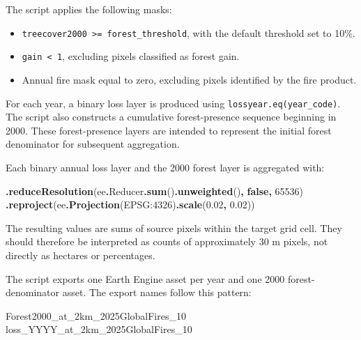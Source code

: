 \documentclass[
]{article}
\newenvironment{Shaded}{\begin{snugshade}}{\end{snugshade}}
\newcommand{\AttributeTok}[1]{\textcolor[rgb]{0.13,0.29,0.53}{#1}}
\newcommand{\DecValTok}[1]{\textcolor[rgb]{0.00,0.00,0.81}{#1}}
\newcommand{\FloatTok}[1]{\textcolor[rgb]{0.00,0.00,0.81}{#1}}
\newcommand{\FunctionTok}[1]{\textcolor[rgb]{0.13,0.29,0.53}{\textbf{#1}}}
\newcommand{\KeywordTok}[1]{\textcolor[rgb]{0.13,0.29,0.53}{\textbf{#1}}}
\newcommand{\NormalTok}[1]{#1}
\newcommand{\OperatorTok}[1]{\textcolor[rgb]{0.81,0.36,0.00}{\textbf{#1}}}
\newcommand{\StringTok}[1]{\textcolor[rgb]{0.31,0.60,0.02}{#1}}
\providecommand{\tightlist}{%
  \setlength{\itemsep}{0pt}\setlength{\parskip}{0pt}}
\begin{document}
The script applies the following masks:

\begin{itemize}
\tightlist
\item
  \texttt{treecover2000\ \textgreater{}=\ forest\_threshold}, with the
  default threshold set to 10\%.
\item
  \texttt{gain\ \textless{}\ 1}, excluding pixels classified as forest
  gain.
\item
  Annual fire mask equal to zero, excluding pixels identified by the
  fire product.
\end{itemize}

For each year, a binary loss layer is produced using
\texttt{lossyear.eq(year\_code)}. The script also constructs a
cumulative forest-presence sequence beginning in 2000. These
forest-presence layers are intended to represent the initial forest
denominator for subsequent aggregation.

Each binary annual loss layer and the 2000 forest layer is aggregated
with:

\begin{Shaded}
\begin{Highlighting}[]
\OperatorTok{.}\FunctionTok{reduceResolution}\NormalTok{(ee}\OperatorTok{.}\AttributeTok{Reducer}\OperatorTok{.}\FunctionTok{sum}\NormalTok{()}\OperatorTok{.}\FunctionTok{unweighted}\NormalTok{()}\OperatorTok{,} \KeywordTok{false}\OperatorTok{,} \DecValTok{65536}\NormalTok{)}
\OperatorTok{.}\FunctionTok{reproject}\NormalTok{(ee}\OperatorTok{.}\FunctionTok{Projection}\NormalTok{(}\StringTok{\textquotesingle{}EPSG:4326\textquotesingle{}}\NormalTok{)}\OperatorTok{.}\FunctionTok{scale}\NormalTok{(}\FloatTok{0.02}\OperatorTok{,} \FloatTok{0.02}\NormalTok{))}
\end{Highlighting}
\end{Shaded}

The resulting values are sums of source pixels within the target grid
cell. They should therefore be interpreted as counts of approximately 30
m pixels, not directly as hectares or percentages.

The script exports one Earth Engine asset per year and one 2000
forest-denominator asset. The export names follow this pattern:

\begin{Shaded}
\begin{Highlighting}[]
\NormalTok{Forest2000\_at\_2km\_2025GlobalFires\_10}
\NormalTok{loss\_YYYY\_at\_2km\_2025GlobalFires\_10}
\end{Highlighting}
\end{Shaded}
\end{document}
